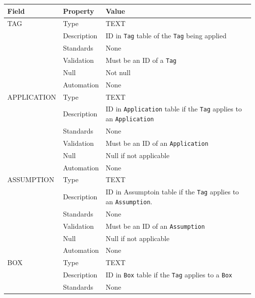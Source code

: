 \documentclass[
]{article}
\newcounter{none} %
\begin{document}
{\def\LTcaptype{none} %
\begin{longtable}[]{@{}
  >{\raggedright\arraybackslash}p{}
  >{\raggedright\arraybackslash}p{}
  >{\raggedright\arraybackslash}p{}@{}}
\toprule\noalign{}
\begin{minipage}[b]{\linewidth}\raggedright
Field
\end{minipage} & \begin{minipage}[b]{\linewidth}\raggedright
Property
\end{minipage} & \begin{minipage}[b]{\linewidth}\raggedright
Value
\end{minipage} \\
\midrule\noalign{}
\endhead
\bottomrule\noalign{}
\endlastfoot
TAG & Type & TEXT \\
& Description & ID in \texttt{Tag} table of the \texttt{Tag} being
applied \\
& Standards & None \\
& Validation & Must be an ID of a \texttt{Tag} \\
& Null & Not null \\
& Automation & None \\
APPLICATION & Type & TEXT \\
& Description & ID in \texttt{Application} table if the \texttt{Tag}
applies to an \texttt{Application} \\
& Standards & None \\
& Validation & Must be an ID of an \texttt{Application} \\
& Null & Null if not applicable \\
& Automation & None \\
ASSUMPTION & Type & TEXT \\
& Description & ID in Assumptoin table if the \texttt{Tag} applies to an
\texttt{Assumption}. \\
& Standards & None \\
& Validation & Must be an ID of an \texttt{Assumption} \\
& Null & Null if not applicable \\
& Automation & None \\
BOX & Type & TEXT \\
& Description & ID in \texttt{Box} table if the \texttt{Tag} applies to
a \texttt{Box} \\
& Standards & None \\

\end{longtable}}
\end{document}
